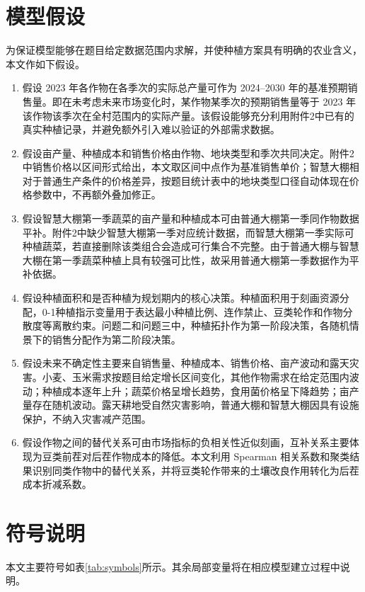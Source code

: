 \section{模型假设}

为保证模型能够在题目给定数据范围内求解，并使种植方案具有明确的农业含义，本文作如下假设。

\begin{enumerate}
  \item 假设 2023 年各作物在各季次的实际总产量可作为 2024--2030 年的基准预期销售量。即在未考虑未来市场变化时，某作物某季次的预期销售量等于 2023 年该作物该季次在全村范围内的实际产量。该假设能够充分利用附件2中已有的真实种植记录，并避免额外引入难以验证的外部需求数据。
  \item 假设亩产量、种植成本和销售价格由作物、地块类型和季次共同决定。附件2中销售价格以区间形式给出，本文取区间中点作为基准销售单价；智慧大棚相对于普通生产条件的价格差异，按题目统计表中的地块类型口径自动体现在价格参数中，不再额外叠加修正。
  \item 假设智慧大棚第一季蔬菜的亩产量和种植成本可由普通大棚第一季同作物数据平补。附件2中缺少智慧大棚第一季对应统计数据，而智慧大棚第一季实际可种植蔬菜，若直接删除该类组合会造成可行集合不完整。由于普通大棚与智慧大棚在第一季蔬菜种植上具有较强可比性，故采用普通大棚第一季数据作为平补依据。
  \item 假设种植面积和是否种植为规划期内的核心决策。种植面积用于刻画资源分配，0-1种植指示变量用于表达最小种植比例、连作禁止、豆类轮作和作物分散度等离散约束。问题二和问题三中，种植拓扑作为第一阶段决策，各随机情景下的销售分配作为第二阶段决策。
  \item 假设未来不确定性主要来自销售量、种植成本、销售价格、亩产波动和露天灾害。小麦、玉米需求按题目给定增长区间变化，其他作物需求在给定范围内波动；种植成本逐年上升；蔬菜价格呈增长趋势，食用菌价格呈下降趋势；亩产量存在随机波动。露天耕地受自然灾害影响，普通大棚和智慧大棚因具有设施保护，不纳入灾害减产范围。
  \item 假设作物之间的替代关系可由市场指标的负相关性近似刻画，互补关系主要体现为豆类前茬对后茬作物成本的降低。本文利用 Spearman 相关系数和聚类结果识别同类作物中的替代关系，并将豆类轮作带来的土壤改良作用转化为后茬成本折减系数。
\end{enumerate}

\section{符号说明}

本文主要符号如表\ref{tab:symbols}所示。其余局部变量将在相应模型建立过程中说明。

